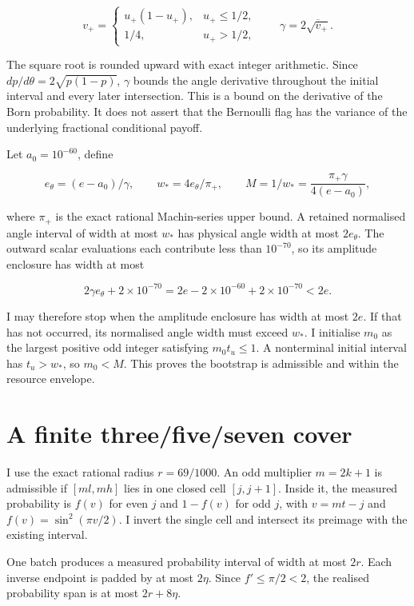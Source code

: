 \[
 v_+=\begin{cases}u_+(1-u_+),&u_+\leq1/2,\\1/4,&u_+>1/2,\end{cases}
 \qquad \gamma=2\overline{\sqrt{v_+}}.
\]

The square root is rounded upward with exact integer arithmetic. Since \(dp/d\theta=2\sqrt{p(1-p)}\), \(\gamma\) bounds the angle derivative throughout the initial interval and every later intersection. This is a bound on the derivative of the Born probability. It does not assert that the Bernoulli flag has the variance of the underlying fractional conditional payoff.

Let \(a_0=10^{-60}\), define

\[
 e_\theta=(e-a_0)/\gamma,\qquad
 w_*=4e_\theta/\pi_+,
 \qquad M=1/w_*=
 \frac{\pi_+\gamma}{4(e-a_0)},
\]

where \(\pi_+\) is the exact rational Machin-series upper bound. A retained normalised angle interval of width at most \(w_*\) has physical angle width at most \(2e_\theta\). The outward scalar evaluations each contribute less than \(10^{-70}\), so its amplitude enclosure has width at most

\[
 2\gamma e_\theta+2\times10^{-70}
 =2e-2\times10^{-60}+2\times10^{-70}<2e.
\]

I may therefore stop when the amplitude enclosure has width at most \(2e\). If that has not occurred, its normalised angle width must exceed \(w_*\). I initialise \(m_0\) as the largest positive odd integer satisfying \(m_0t_u\leq1\). A nonterminal initial interval has \(t_u>w_*\), so \(m_0<M\). This proves the bootstrap is admissible and within the resource envelope.

\section{A finite three/five/seven cover}
\label{sec:miqae-cover}

I use the exact rational radius \(r=69/1000\). An odd multiplier \(m=2k+1\) is admissible if \([ml,mh]\) lies in one closed cell \([j,j+1]\). Inside it, the measured probability is \(f(v)\) for even \(j\) and \(1-f(v)\) for odd \(j\), with \(v=mt-j\) and \(f(v)=\sin^2(\pi v/2)\). I invert the single cell and intersect its preimage with the existing interval.

One batch produces a measured probability interval of width at most \(2r\). Each inverse endpoint is padded by at most \(2\eta\). Since \(f'\leq\pi/2<2\), the realised probability span is at most \(2r+8\eta\).


